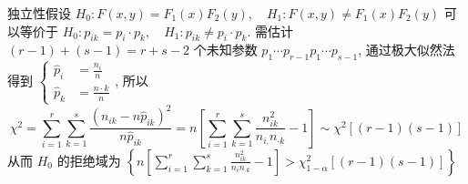 \documentclass[10pt]{yerbaformat}
\begin{document}
\par 独立性假设 $H_{0}: F(x, y)=F_{1}(x) F_{2}(y), \quad H_{1}: F(x, y) \neq F_{1}(x) F_{2}(y)$ 可以等价于 $H_{0}: p_{i k}=p_{i} \cdot p_{k}, \quad H_{1}: p_{i k} \neq p_{i} \cdot p_{k}$. 需估计 $(r-1)+(s-1)=r+s-2$ 个未知参数 $p_{1} \cdots p_{r-1} p_{1} \cdots p_{s-1}$, 通过极大似然法得到 $\left\{\begin{aligned} \hat{p}_{i} &=\frac{n_{i}}{n} \\ \hat{p}_{k} &=\frac{n \cdot k}{n} \end{aligned}\right.$, 所以 $$\chi^{2}=\sum_{i=1}^{r} \sum_{k=1}^{s} \frac{\left(n_{i k}-n \hat{p}_{i k}\right)^{2}}{n \hat{p}_{i k}}=n\left[\sum_{i=1}^{r} \sum_{k=1}^{s} \frac{n_{i k}^{2}}{n_{i .} n_{\cdot k}}-1\right] \sim \chi^{2}[(r-1)(s-1)] $$ 从而 $H_{0}$ 的拒绝域为 $\left\{n\left[\sum_{i=1}^{r} \sum_{k=1}^{s} \frac{n_{i k}^{2}}{n_{i} n_{\cdot k}}-1\right]>\chi_{1-\alpha}^{2}[(r-1)(s-1)]\right\}$
\end{document}
